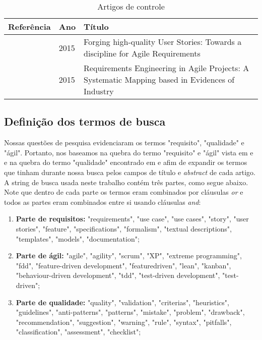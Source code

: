 \begin{table}[!h]
\renewcommand{\arraystretch}{1.3}
\caption{Artigos de controle}
\label{table_controle}
\centering
\begin{tabular}{|m{1cm}||m{0.5cm}||m{5.5cm}|}
\hline
Referência & Ano & Título  \\ 
\hline\hline
 \cite{Lucassen_2015} & 2015 & Forging high-quality User Stories: Towards a discipline for Agile Requirements \\
 \hline
 \cite{Medeiros_2015} & 2015 & Requirements Engineering in Agile Projects: A Systematic Mapping based in Evidences of Industry \\
\hline
\end{tabular}
\end{table}

\subsection{Definição dos termos de busca}

Nossas questões de pesquisa evidenciaram os termos "requisito", "qualidade" e "ágil". Portanto, nos baseamos na quebra do termo "requisito" e "ágil" vista em \cite{Medeiros_2015} e \cite{Inayat_2015} e na quebra do termo "qualidade" encontrado em \cite{Tiwari_2015} e \cite{Attar_2012} afim de expandir os termos que tinham durante nossa busca pelos campos de título e \textit{abstract} de cada artigo. A string de busca usada neste trabalho contém três partes, como segue abaixo. Note que dentro de cada parte os termos eram combinados por cláusulas \textit{or} e todos as partes eram combinados entre si usando cláusulas \textit{and}:

\begin{enumerate}
\item \textbf{Parte de requisitos:} "requirements", "use case", "use cases", "story", "user stories", "feature", "specifications", "formalism", "textual descriptions", "templates", "models", "documentation";
\item \textbf{Parte de ágil:} "agile", "agility", "scrum", "XP", "extreme programming", "fdd", "feature-driven development", "featuredriven", "lean", "kanban", "behaviour-driven development", "tdd", "test-driven development", "test-driven";
\item \textbf{Parte de qualidade:} "quality", "validation", "criterias", "heuristics", "guidelines", "anti-patterns", "patterns", "mistake", "problem", "drawback", "recommendation", "suggestion", "warning", "rule", "syntax", "pitfalls", "classification", "assessment", "checklist";
\end{enumerate}

